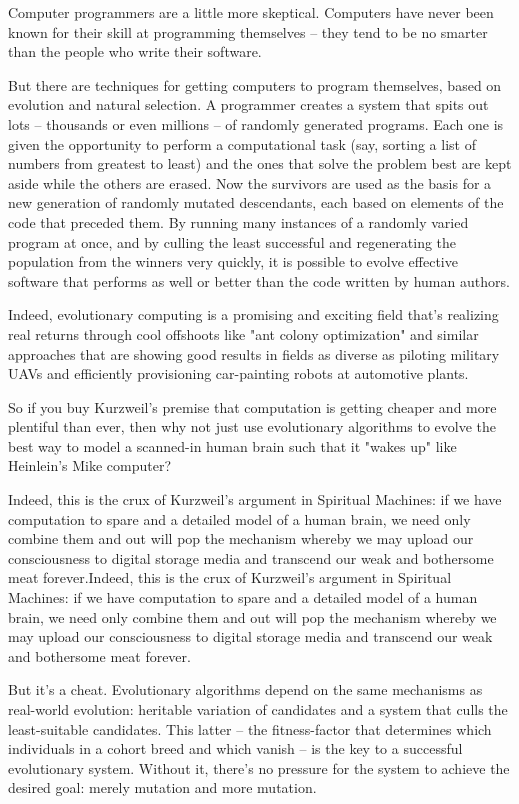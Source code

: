 Computer programmers are a little more skeptical. Computers have
never been known for their skill at programming themselves -- they
tend to be no smarter than the people who write their software.

But there are techniques for getting computers to program
themselves, based on evolution and natural selection. A programmer
creates a system that spits out lots -- thousands or even millions
-- of randomly generated programs. Each one is given the
opportunity to perform a computational task (say, sorting a list of
numbers from greatest to least) and the ones that solve the problem
best are kept aside while the others are erased. Now the survivors
are used as the basis for a new generation of randomly mutated
descendants, each based on elements of the code that preceded them.
By running many instances of a randomly varied program at once, and
by culling the least successful and regenerating the population
from the winners very quickly, it is possible to evolve effective
software that performs as well or better than the code written by
human authors.

Indeed, evolutionary computing is a promising and exciting field
that's realizing real returns through cool offshoots like "ant
colony optimization" and similar approaches that are showing good
results in fields as diverse as piloting military UAVs and
efficiently provisioning car-painting robots at automotive plants.

So if you buy Kurzweil's premise that computation is getting
cheaper and more plentiful than ever, then why not just use
evolutionary algorithms to evolve the best way to model a
scanned-in human brain such that it "wakes up" like Heinlein's Mike
computer?

Indeed, this is the crux of Kurzweil's argument in Spiritual
Machines: if we have computation to spare and a detailed model of a
human brain, we need only combine them and out will pop the
mechanism whereby we may upload our consciousness to digital
storage media and transcend our weak and bothersome meat
forever.Indeed, this is the crux of Kurzweil's argument in
Spiritual Machines: if we have computation to spare and a detailed
model of a human brain, we need only combine them and out will pop
the mechanism whereby we may upload our consciousness to digital
storage media and transcend our weak and bothersome meat forever.

But it's a cheat. Evolutionary algorithms depend on the same
mechanisms as real-world evolution: heritable variation of
candidates and a system that culls the least-suitable candidates.
This latter -- the fitness-factor that determines which individuals
in a cohort breed and which vanish -- is the key to a successful
evolutionary system. Without it, there's no pressure for the system
to achieve the desired goal: merely mutation and more mutation.

